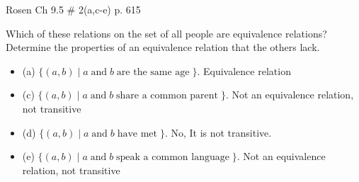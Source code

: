 \begin{questions}
	\ifprintanswers
        \vspace{-5pt}
    \fi
 Rosen Ch 9.5 \# 2(a,c-e) p. 615
    \ifprintanswers
        \vspace{-15pt}
    \fi
    \begin{EnvFullwidth}
    \begin{solution}
    Which of these relations on the set of all people are equivalence relations?  Determine the properties of an equivalence relation that the others lack. 
    \begin{itemize}[itemsep=2pt,parsep=0pt,topsep=0pt,partopsep=0pt]
        \item[] (a) $\{(a,b) \;|\; a \;\text{and}\; b \;\text{are the same age}\;\}$.
          Equivalence relation 
        
       \item[] (c) $\{(a,b) \;|\; a \;\text{and}\; b \;\text{share a common parent}\;\}$.  
       Not an equivalence relation, not transitive
       \item[] (d) $\{(a,b) \;|\; a \;\text{and}\; b \;\text{have met}\;\}$.         
       No, It is not transitive.
       \item[] (e) $\{(a,b) \;|\; a \;\text{and}\; b \;\text{speak a common language}\;\}$. 
       Not an equivalence relation, not transitive 
    \end{itemize}
    \end{solution}
    \end{EnvFullwidth}





\end{questions}
